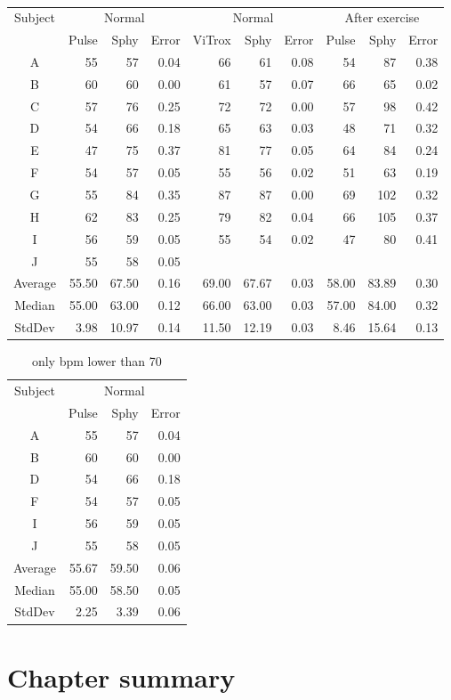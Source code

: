 \begin{table}
  \centering
  \begin{tabular}{c*{9}{r}}
    \hline
      \multirow{2}{*}{Subject} &
      \multicolumn{3}{c}{Normal} &
      \multicolumn{3}{c}{Normal} &
      \multicolumn{3}{c}{After exercise} \\
    \cline{2-10}
      & Pulse & Sphy & Error
      & ViTrox & Sphy & Error
      & Pulse & Sphy & Error \\
    \hline
      A & 55 & 57 & 0.04 & 66 & 61 & 0.08 & 54 &  87 & 0.38 \\
      B & 60 & 60 & 0.00 & 61 & 57 & 0.07 & 66 &  65 & 0.02 \\
      C & 57 & 76 & 0.25 & 72 & 72 & 0.00 & 57 &  98 & 0.42 \\
      D & 54 & 66 & 0.18 & 65 & 63 & 0.03 & 48 &  71 & 0.32 \\
      E & 47 & 75 & 0.37 & 81 & 77 & 0.05 & 64 &  84 & 0.24 \\
      F & 54 & 57 & 0.05 & 55 & 56 & 0.02 & 51 &  63 & 0.19 \\
      G & 55 & 84 & 0.35 & 87 & 87 & 0.00 & 69 & 102 & 0.32 \\
      H & 62 & 83 & 0.25 & 79 & 82 & 0.04 & 66 & 105 & 0.37 \\
      I & 56 & 59 & 0.05 & 55 & 54 & 0.02 & 47 &  80 & 0.41 \\
      J & 55 & 58 & 0.05 &    &    &      &    &     &      \\
    \hline
      Average & 55.50 & 67.50 & 0.16 & 69.00 & 67.67 & 0.03 & 58.00 & 83.89 & 0.30 \\
      Median  & 55.00 & 63.00 & 0.12 & 66.00 & 63.00 & 0.03 & 57.00 & 84.00 & 0.32 \\
      StdDev  &  3.98 & 10.97 & 0.14 & 11.50 & 12.19 & 0.03 &  8.46 & 15.64 & 0.13 \\
    \hline
  \end{tabular}
  \caption{}
  \label{}
\end{table}

\begin{table}
  \centering
  \begin{tabular}{crrr}
    \hline
      \multirow{2}{*}{Subject} &
      \multicolumn{3}{c}{Normal} \\
    \cline{2-4}
      & Pulse & Sphy & Error \\
    \hline
      A & 55 & 57 & 0.04 \\
      B & 60 & 60 & 0.00 \\
      D & 54 & 66 & 0.18 \\
      F & 54 & 57 & 0.05 \\
      I & 56 & 59 & 0.05 \\
      J & 55 & 58 & 0.05 \\
    \hline
      Average & 55.67 & 59.50 & 0.06 \\
      Median  & 55.00 & 58.50 & 0.05 \\
      StdDev  &  2.25 &  3.39 & 0.06 \\
    \hline
  \end{tabular}
  \caption{only bpm lower than 70}
  \label{}
\end{table}

\section{Chapter summary}

